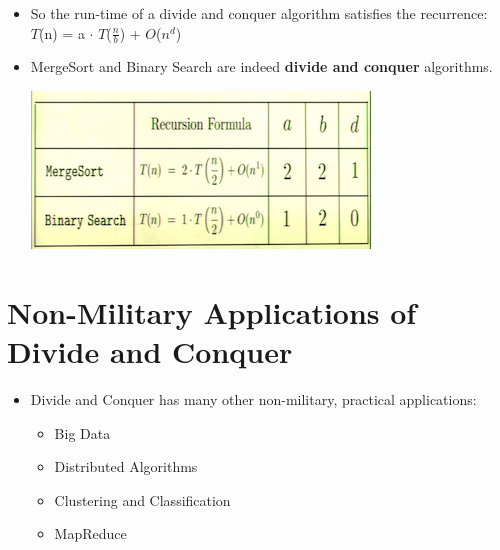 \documentclass[12pt]{article}
\begin{document}
\begin{itemize}
\begin{itemize}
\item So the run-time of a divide and conquer algorithm satisfies the recurrence:\\
\hspace*{\fill}\large{$T$(n) = a $\cdot$ $T$($\frac{n}{b}$) + $O$($n^d$)} \hspace*{\fill} \\
\item MergeSort and Binary Search are indeed \textbf{divide and conquer} algorithms.
\begin{center}
\includegraphics{lecture2g}
\end{center}	
\end{itemize}
\end{itemize}


\section{Non-Military Applications of Divide and Conquer}
\begin{itemize}
\item Divide and Conquer has many other non-military, practical applications:
	\begin{itemize}
	\item Big Data
	\item Distributed Algorithms
	\item Clustering and Classification
	\item MapReduce
	\end{itemize}
\end{itemize}
\end{document}
